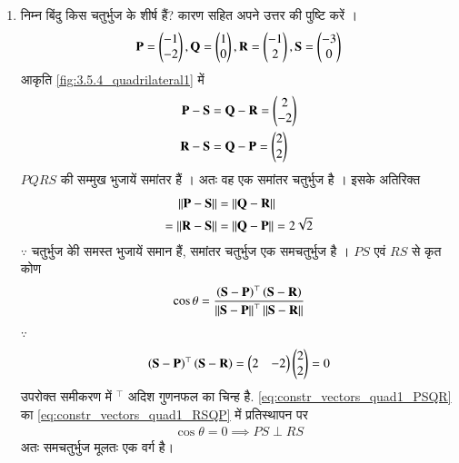 \begin{enumerate}[label=\thesection.\arabic*.,ref=\thesection.\theenumi]


\item निम्न बिंदु किस चतुर्भुज के शीर्ष हैं? कारण सहित अपने उत्तर की पुष्टि करें ।
\begin{align}
\mathbf{P} = \begin{pmatrix}-1\\-2\end{pmatrix}, \mathbf{Q} =\begin{pmatrix}1\\0\end{pmatrix},
\mathbf{R} =\begin{pmatrix}-1\\2\end{pmatrix}, \mathbf{S} =\begin{pmatrix}-3\\0\end{pmatrix}
\end{align}
\solution
आकृति 	\ref{fig:3.5.4_quadrilateral1} में
\begin{align}
\label{eq:constr_vectors_quad1_PSQR}
 \mathbf{P} - \mathbf{S} &= 
 \mathbf{Q} - \mathbf{R} = \begin{pmatrix}2\\-2\end{pmatrix}
\\
\mathbf {R} - \mathbf {S} &=
 \mathbf {Q} - \mathbf {P} = \begin{pmatrix}2\\2\end{pmatrix}
\label{eq:constr_vectors_quad1_RSQP}
\end{align}
%
$PQRS$ की सम्मुख भुजायें  समांतर हैं । अतः वह एक समांतर चतुर्भुज है । इसके अतिरिक्त
\begin{align}
\left\lVert \mathbf{P} - \mathbf{S}\right\rVert &= 
\left\lVert \mathbf{Q} - \mathbf{R}\right\rVert 
\\
=\left\lVert\mathbf {R} - \mathbf {S}\right\rVert &=
\left\lVert \mathbf {Q} - \mathbf {P}\right\rVert = 2\sqrt{2}
\end{align}
%
$\because$ चतुर्भुज कीे समस्त भुजायें समान हैं, समांतर चतुर्भुज एक समचतुर्भुज है ।   $PS$ एवं
$RS$ से कृत कोण
\begin{align}
\cos \theta = \frac{\left(\mathbf{S}-\mathbf{P}\right)^{\top}\left(\mathbf{S}-\mathbf{R}\right)}{\left\lVert\mathbf{S}-\mathbf{P}\right\rVert^{\top}\left\lVert\mathbf{S}-\mathbf{R}\right\rVert}
\end{align}
%
$\because $
\begin{align}
\left(\mathbf{S}-\mathbf{P}\right)^{\top}\left(\mathbf{S}-\mathbf{R}\right) = \begin{pmatrix}2 & -2\end{pmatrix}\begin{pmatrix}2\\2\end{pmatrix} = 0
\end{align}
उपरोक्त समीकरण में $^{\top}$ अदिश गुणनफल का चिन्ह है.
\eqref{eq:constr_vectors_quad1_PSQR} का  \eqref{eq:constr_vectors_quad1_RSQP} में प्रतिस्थापन पर
\begin{align}
\cos \theta = 0 \implies PS \perp RS
\end{align}
%
अतः समचतुर्भुज मूलतः एक वर्ग है। 
\begin{figure}[!ht]
	\centering

\end{figure}
\end{enumerate}
